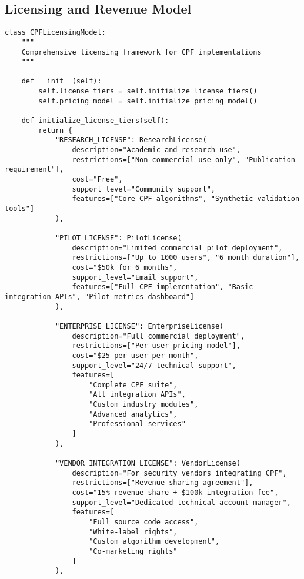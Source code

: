 \documentclass[10pt,twocolumn]{IEEEtran}
\begin{document}
\subsection{Licensing and Revenue Model}

\begin{lstlisting}[caption={CPF Licensing Framework}]
class CPFLicensingModel:
    """
    Comprehensive licensing framework for CPF implementations
    """
    
    def __init__(self):
        self.license_tiers = self.initialize_license_tiers()
        self.pricing_model = self.initialize_pricing_model()
        
    def initialize_license_tiers(self):
        return {
            "RESEARCH_LICENSE": ResearchLicense(
                description="Academic and research use",
                restrictions=["Non-commercial use only", "Publication requirement"],
                cost="Free",
                support_level="Community support",
                features=["Core CPF algorithms", "Synthetic validation tools"]
            ),
            
            "PILOT_LICENSE": PilotLicense(
                description="Limited commercial pilot deployment",
                restrictions=["Up to 1000 users", "6 month duration"],
                cost="$50k for 6 months",
                support_level="Email support",
                features=["Full CPF implementation", "Basic integration APIs", "Pilot metrics dashboard"]
            ),
            
            "ENTERPRISE_LICENSE": EnterpriseLicense(
                description="Full commercial deployment",
                restrictions=["Per-user pricing model"],
                cost="$25 per user per month",
                support_level="24/7 technical support",
                features=[
                    "Complete CPF suite", 
                    "All integration APIs",
                    "Custom industry modules",
                    "Advanced analytics",
                    "Professional services"
                ]
            ),
            
            "VENDOR_INTEGRATION_LICENSE": VendorLicense(
                description="For security vendors integrating CPF",
                restrictions=["Revenue sharing agreement"],
                cost="15% revenue share + $100k integration fee",
                support_level="Dedicated technical account manager",
                features=[
                    "Full source code access",
                    "White-label rights",
                    "Custom algorithm development",
                    "Co-marketing rights"
                ]
            ),
            

\end{lstlisting}
\end{document}

